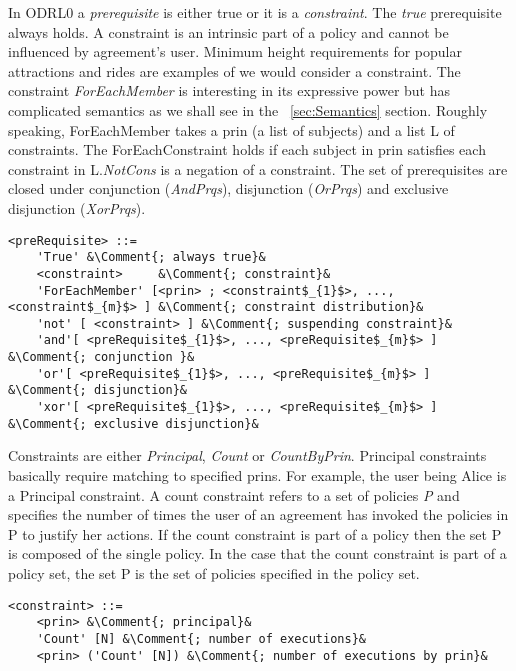 In ODRL0 a \emph{prerequisite} is either true or it is a \emph{constraint}. The \emph{true} prerequisite always holds. A constraint is an intrinsic part of a policy and cannot be influenced by agreement's user. Minimum height requirements for popular attractions and rides are examples of we would consider a constraint. The constraint \emph{ForEachMember} is interesting in its expressive power but has complicated semantics as we shall see in the ~\ref{sec:Semantics} section. Roughly speaking, ForEachMember takes a prin (a list of subjects) and a list L of constraints. The ForEachConstraint holds if each subject in prin satisfies each constraint in L.\emph{NotCons} is a negation of a constraint. The set of prerequisites are closed under conjunction (\emph{AndPrqs}), disjunction (\emph{OrPrqs}) and exclusive disjunction (\emph{XorPrqs}).


\lstset{mathescape, language=AST, escapechar=\&}  
\begin{lstlisting}[frame=single, caption={preRequisite},label={lst:preRequisiteast}]
<preRequisite> ::=  
	'True' &\Comment{; always true}&
	<constraint>	 &\Comment{; constraint}&
	'ForEachMember' [<prin> ; <constraint$_{1}$>, ..., <constraint$_{m}$> ]	&\Comment{; constraint distribution}&
	'not' [ <constraint> ] &\Comment{; suspending constraint}&
	'and'[ <preRequisite$_{1}$>, ..., <preRequisite$_{m}$> ] &\Comment{; conjunction }&
	'or'[ <preRequisite$_{1}$>, ..., <preRequisite$_{m}$> ] &\Comment{; disjunction}&
	'xor'[ <preRequisite$_{1}$>, ..., <preRequisite$_{m}$> ] &\Comment{; exclusive disjunction}&
\end{lstlisting}

Constraints are either \emph{Principal}, \emph{Count} or \emph{CountByPrin}. Principal constraints basically require matching to specified prins. For example, the user being Alice is a Principal constraint. A count constraint refers to a set of policies \emph{P} and specifies the number of times the user of an agreement has invoked the policies in P to justify her actions. If the count constraint is part of a policy then the set P is composed of the single policy. In the case that the count constraint is part of a policy set, the set P is the set of policies specified in the policy set.

\lstset{mathescape, language=AST, escapechar=\&}  
\begin{lstlisting}[frame=single, caption={constraint},label={lst:constraintast}]
<constraint> ::=  
	<prin> &\Comment{; principal}&
	'Count' [N] &\Comment{; number of executions}&
	<prin> ('Count' [N]) &\Comment{; number of executions by prin}&
\end{lstlisting}

